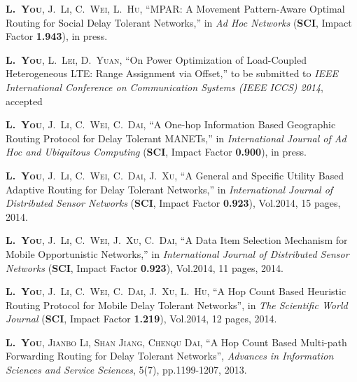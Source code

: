 
\begin{publications}{99}

%

\item\textsc{\textbf{L.~You}, J.~Li, C.~Wei, L.~Hu}, ``MPAR: A Movement Pattern-Aware Optimal Routing for Social Delay Tolerant Networks,'' in \textit{Ad Hoc Networks} (\textbf{SCI}, Impact Factor \textbf{1.943}), in press.

\item\textsc{\textbf{L.~You}, L.~Lei, D.~Yuan}, ``On Power Optimization of Load-Coupled Heterogeneous LTE: Range Assignment via Offset,'' to be submitted to \textit{IEEE International Conference on Communication Systems (IEEE ICCS) 2014}, accepted

\item\textsc{\textbf{L.~You}, J.~Li, C.~Wei, C.~Dai}, ``A One-hop Information Based Geographic Routing Protocol for Delay Tolerant MANETs,'' in \textit{International Journal of Ad Hoc and Ubiquitous Computing} (\textbf{SCI}, Impact Factor \textbf{0.900}), in press.

\item\textsc{\textbf{L.~You}, J.~Li, C.~Wei, C.~Dai, J.~Xu}, ``A General and Specific Utility Based Adaptive Routing for Delay Tolerant Networks,'' in \textit{International Journal of Distributed Sensor Networks} (\textbf{SCI}, Impact Factor \textbf{0.923}), Vol.2014, 15 pages, 2014.

\item\textsc{\textbf{L.~You}, J.~Li, C.~Wei, J.~Xu, C.~Dai}, ``A Data Item Selection Mechanism for Mobile Opportunistic Networks,'' in \textit{International Journal of Distributed Sensor Networks} (\textbf{SCI}, Impact Factor \textbf{0.923}), Vol.2014, 11 pages, 2014.

\item\textsc{\textbf{L.~You}, J.~Li, C.~Wei, C.~Dai, J.~Xu, L.~Hu}, ``A Hop Count Based Heuristic Routing Protocol for Mobile Delay Tolerant Networks'', in \textit{The Scientific World Journal} (\textbf{SCI}, Impact Factor \textbf{1.219}), Vol.2014, 12 pages, 2014.

\item\textsc{\textbf{L.~You}, Jianbo Li, Shan Jiang, Chenqu Dai}, ``A Hop Count Based Multi-path Forwarding Routing for Delay Tolerant Networks'', {\it Advances in Information Sciences and Service Sciences}, 5(7), pp.1199-1207, 2013.
    
\end{publications}


